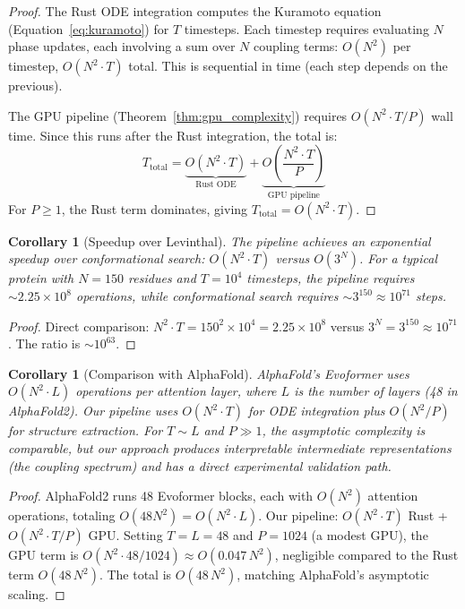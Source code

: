 \documentclass[11pt,twocolumn,a4paper]{article}
\newtheorem{corollary}[theorem]{Corollary}
\theoremstyle{definition}
\theoremstyle{remark}
\begin{document}
\begin{proof}
The Rust ODE integration computes the Kuramoto equation (Equation~\ref{eq:kuramoto}) for $T$ timesteps. Each timestep requires evaluating $N$ phase updates, each involving a sum over $N$ coupling terms: $O(N^2)$ per timestep, $O(N^2 \cdot T)$ total. This is sequential in time (each step depends on the previous).

The GPU pipeline (Theorem~\ref{thm:gpu_complexity}) requires $O(N^2 \cdot T / P)$ wall time. Since this runs after the Rust integration, the total is:
\begin{equation}
T_{\text{total}} = \underbrace{O(N^2 \cdot T)}_{\text{Rust ODE}} + \underbrace{O\!\left(\frac{N^2 \cdot T}{P}\right)}_{\text{GPU pipeline}}
\end{equation}
For $P \geq 1$, the Rust term dominates, giving $T_{\text{total}} = O(N^2 \cdot T)$.
\end{proof}

\begin{corollary}[Speedup over Levinthal]
\label{cor:speedup_levinthal}
The pipeline achieves an exponential speedup over conformational search: $O(N^2 \cdot T)$ versus $O(3^N)$. For a typical protein with $N = 150$ residues and $T = 10^4$ timesteps, the pipeline requires $\sim 2.25 \times 10^8$ operations, while conformational search requires $\sim 3^{150} \approx 10^{71}$ steps.
\end{corollary}

\begin{proof}
Direct comparison: $N^2 \cdot T = 150^2 \times 10^4 = 2.25 \times 10^8$ versus $3^N = 3^{150} \approx 10^{71}$. The ratio is $\sim 10^{63}$.
\end{proof}

\begin{corollary}[Comparison with AlphaFold]
\label{cor:comparison_alphafold}
AlphaFold's Evoformer uses $O(N^2 \cdot L)$ operations per attention layer, where $L$ is the number of layers (48 in AlphaFold2). Our pipeline uses $O(N^2 \cdot T)$ for ODE integration plus $O(N^2/P)$ for structure extraction. For $T \sim L$ and $P \gg 1$, the asymptotic complexity is comparable, but our approach produces interpretable intermediate representations (the coupling spectrum) and has a direct experimental validation path.
\end{corollary}

\begin{proof}
AlphaFold2 \citep{jumper2021} runs 48 Evoformer blocks, each with $O(N^2)$ attention operations, totaling $O(48 N^2) = O(N^2 \cdot L)$. Our pipeline: $O(N^2 \cdot T)$ Rust + $O(N^2 \cdot T/P)$ GPU. Setting $T = L = 48$ and $P = 1024$ (a modest GPU), the GPU term is $O(N^2 \cdot 48/1024) \approx O(0.047 \, N^2)$, negligible compared to the Rust term $O(48 \, N^2)$. The total is $O(48 \, N^2)$, matching AlphaFold's asymptotic scaling.
\end{proof}
\end{document}
